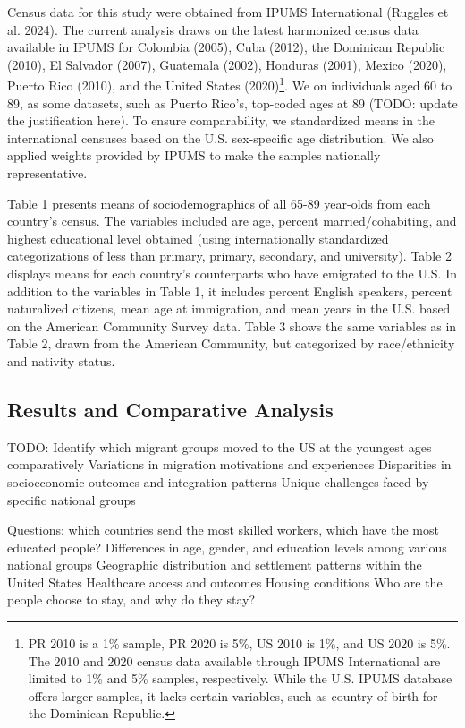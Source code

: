 \documentclass[
]{article}
\begin{document}
Census data for this study were obtained from IPUMS International
(Ruggles et al. 2024). The current analysis draws on the latest
harmonized census data available in IPUMS for Colombia (2005), Cuba
(2012), the Dominican Republic (2010), El Salvador (2007), Guatemala
(2002), Honduras (2001), Mexico (2020), Puerto Rico (2010), and the
United States (2020)\footnote{PR 2010 is a 1\% sample, PR 2020 is 5\%,
  US 2010 is 1\%, and US 2020 is 5\%. The 2010 and 2020 census data
  available through IPUMS International are limited to 1\% and 5\%
  samples, respectively. While the U.S. IPUMS database offers larger
  samples, it lacks certain variables, such as country of birth for the
  Dominican Republic.}. We on individuals aged 60 to 89, as some
datasets, such as Puerto Rico's, top-coded ages at 89 (TODO: update the
justification here). To ensure comparability, we standardized means in
the international censuses based on the U.S. sex-specific age
distribution. We also applied weights provided by IPUMS to make the
samples nationally representative.

Table 1 presents means of sociodemographics of all 65-89 year-olds from
each country's census. The variables included are age, percent
married/cohabiting, and highest educational level obtained (using
internationally standardized categorizations of less than primary,
primary, secondary, and university). Table 2 displays means for each
country's counterparts who have emigrated to the U.S. In addition to the
variables in Table 1, it includes percent English speakers, percent
naturalized citizens, mean age at immigration, and mean years in the
U.S. based on the American Community Survey data. Table 3 shows the same
variables as in Table 2, drawn from the American Community, but
categorized by race/ethnicity and nativity status.

\subsection{Results and Comparative Analysis}\label{sec-results}

TODO: Identify which migrant groups moved to the US at the youngest ages
comparatively Variations in migration motivations and experiences
Disparities in socioeconomic outcomes and integration patterns Unique
challenges faced by specific national groups

Questions: which countries send the most skilled workers, which have the
most educated people? Differences in age, gender, and education levels
among various national groups Geographic distribution and settlement
patterns within the United States Healthcare access and outcomes Housing
conditions Who are the people choose to stay, and why do they stay?
\end{document}
